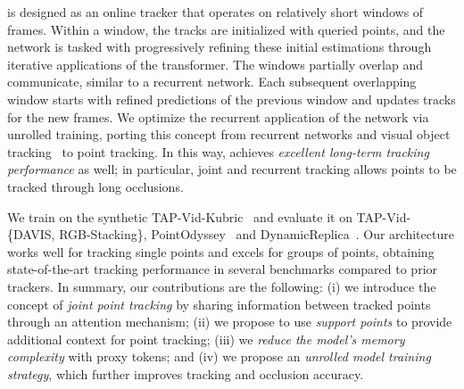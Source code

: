 \method is designed as an online tracker that operates on relatively short windows of frames.
Within a window, the tracks are initialized with queried points, and the network is tasked with progressively refining these initial estimations through iterative applications of the transformer.
The windows partially overlap and communicate, similar to a recurrent network.
Each subsequent overlapping window starts with refined predictions of the previous window and updates tracks for the new frames.
We optimize the recurrent application of the network via unrolled training, porting this concept from recurrent networks and visual object tracking~\cite{held2016learning, girshick2015deformable} to point tracking.
In this way,
\method achieves \emph{excellent long-term tracking performance} as well; in particular, joint and recurrent tracking allows points to be tracked through long occlusions.

We train \method on the synthetic TAP-Vid-Kubric~\cite{tapvid} and evaluate it on  TAP-Vid-\{DAVIS, RGB-Stacking\}, PointOdyssey~\cite{zheng2023pointodyssey} and DynamicReplica~\cite{karaev2023dynamicstereo}.
Our architecture works well for tracking single points and excels for groups of points, obtaining state-of-the-art tracking performance in several benchmarks compared to prior trackers.
In summary, our contributions are the following:
(i) we introduce the concept of \emph{joint point tracking} by sharing information between tracked points through an attention mechanism;
(ii) we propose to use \emph{support points} to provide additional context for point tracking;
(iii) we \emph{reduce the model's memory complexity} with proxy tokens; and
(iv) we propose an \emph{unrolled model training strategy}, which further improves tracking and occlusion accuracy.


